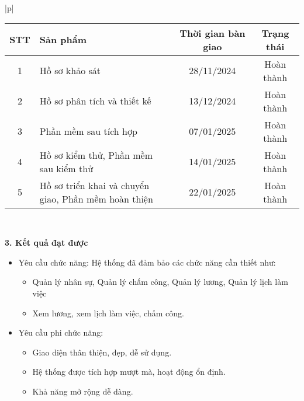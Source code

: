 \begin{longtable}{|p{\textwidth}|}
    \begin{tabular}{|c|p{}|c|c|}
        \hline
        \textbf{STT} & \textbf{Sản phẩm}                                    & \textbf{Thời gian bàn giao} & \textbf{Trạng thái} \\ \hline
        1            & Hồ sơ khảo sát                                       & 28/11/2024                  & Hoàn thành          \\ \hline
        2            & Hồ sơ phân tích và thiết kế                          & 13/12/2024                  & Hoàn thành          \\ \hline
        3            & Phần mềm sau tích hợp                                & 07/01/2025                  & Hoàn thành          \\ \hline
        4            & Hồ sơ kiểm thử, Phần mềm sau kiểm thử                & 14/01/2025                  & Hoàn thành          \\ \hline
        5            & Hồ sơ triển khai và chuyển giao, Phần mềm hoàn thiện & 22/01/2025                  & Hoàn thành          \\ \hline
    \end{tabular}                                        \\ \hline

    \begin{minipage}{\textwidth}
        \noindent\textbf{3. Kết quả đạt được}
        \begin{itemize}
            \item Yêu cầu chức năng: Hệ thống đã đảm bảo các chức năng cần thiết như:
                  \begin{itemize}
                      \item Quản lý nhân sự, Quản lý chấm công, Quản lý lương, Quản lý lịch làm việc
                      \item Xem lương, xem lịch làm việc, chấm công.
                  \end{itemize}
            \item Yêu cầu phi chức năng:
                  \begin{itemize}
                      \item Giao diện thân thiện, đẹp, dễ sử dụng.
                      \item Hệ thống được tích hợp mượt mà, hoạt động ổn định.
                      \item Khả năng mở rộng dễ dàng.
                  \end{itemize}
        \end{itemize}
        \vspace{0.5cm}


\end{minipage}
\end{longtable}
